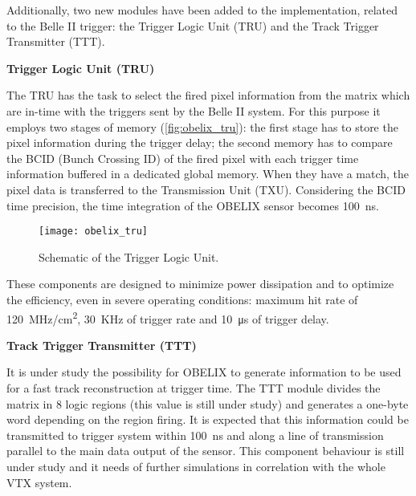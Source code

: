 Additionally, two new modules have been added to the implementation, related to the Belle II trigger: the Trigger Logic Unit (TRU) and the Track Trigger Transmitter (TTT). 

\begin{description}
\item \textbf{Trigger Logic Unit (TRU)}
\end{description}

The TRU has the task to select the fired pixel information from the matrix which are in-time with the triggers sent by the Belle II system. For this purpose it employs two stages of memory (\autoref{fig:obelix_tru}): the first stage has to store the pixel information during the trigger delay; the second memory has to compare the BCID (Bunch Crossing ID) of the fired pixel with each trigger time information buffered in a dedicated global memory. When they have a match, the pixel data is transferred to the Transmission Unit (TXU). Considering the BCID time precision, the time integration of the OBELIX sensor becomes \SI{100}{ns}.

\begin{figure}[h!]
\centering
\texttt{[image: obelix\_tru]}
\caption{Schematic of the Trigger Logic Unit.}
\label{fig:obelix_tru}
\end{figure}

These components are designed to minimize power dissipation and to optimize the efficiency, even in severe operating conditions: maximum hit rate of \SI{120}{MHz/cm^{2}}, \SI{30}{KHz} of trigger rate and \SI{10}{\micro s} of trigger delay.


\begin{description}
\item \textbf{Track Trigger Transmitter (TTT)}
\end{description}

It is under study the possibility for OBELIX to generate information to be used for a fast track reconstruction at trigger time.
The TTT module divides the matrix in 8 logic regions (this value is still under study) and generates a one-byte word depending on the region firing. It is expected that this information could be transmitted to trigger system within \SI{100}{ns} and along a line of transmission parallel to the main data output of the sensor. 
This component behaviour is still under study and it needs of further simulations in correlation with the whole VTX system.

